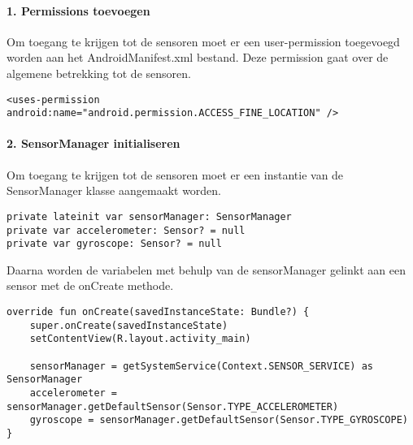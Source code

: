 \paragraph{1. Permissions toevoegen}
Om toegang te krijgen tot de sensoren moet er een user-permission toegevoegd worden aan het 
AndroidManifest.xml bestand. Deze permission gaat over de algemene betrekking tot de sensoren.
\begin{verbatim}
<uses-permission android:name="android.permission.ACCESS_FINE_LOCATION" />
\end{verbatim}

\paragraph{2. SensorManager initialiseren}
Om toegang te krijgen tot de sensoren moet er een instantie van de SensorManager klasse aangemaakt worden.
\begin{verbatim}
private lateinit var sensorManager: SensorManager
private var accelerometer: Sensor? = null
private var gyroscope: Sensor? = null
\end{verbatim}
Daarna worden de variabelen met behulp van de sensorManager gelinkt aan een sensor met de onCreate methode.
\begin{verbatim}
override fun onCreate(savedInstanceState: Bundle?) {
    super.onCreate(savedInstanceState)
    setContentView(R.layout.activity_main)

    sensorManager = getSystemService(Context.SENSOR_SERVICE) as SensorManager
    accelerometer = sensorManager.getDefaultSensor(Sensor.TYPE_ACCELEROMETER)
    gyroscope = sensorManager.getDefaultSensor(Sensor.TYPE_GYROSCOPE)
}
\end{verbatim}

